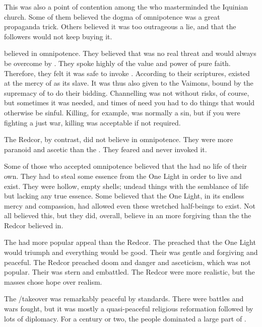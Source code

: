   This was also a point of contention among the \resphain who masterminded the Iquinian church.
  Some of them believed the dogma of omnipotence was a great propaganda trick.
  Others believed it was too outrageous a lie, and that the followers would not keep buying it. 
  
  \ClanTelcra believed in omnipotence. 
  They believed that \itzach was no real threat and would always be overcome by \iquin.
  They spoke highly of the value and power of pure faith. 
  Therefore, they felt it was safe to invoke \itzach. 
  According to their scriptures, \itzach existed at the mercy of \iquin as its slave. 
  It was thus also given to the Vaimons, bound by the supremacy of \iquin to do their bidding. 
  Channelling \itzach was not without risks, of course, but sometimes it was needed, and times of need you had to do things that would otherwise be sinful. 
  Killing, for example, was normally a sin, but if you were fighting a just war, killing was acceptable if not required. 
  
  The Redcor, by contrast, did not believe in omnipotence. 
  They were more paranoid and ascetic than the \Telcras. 
  They feared \itzach and never invoked it. 
  
  Some of those who accepted omnipotence believed that the \qliphoth had no life of their own.
  They had to steal some essence from the One Light in order to live and exist. 
  They were hollow, empty shells; undead things with the semblance of life but lacking any true essence. 
  Some believed that the One Light, in its endless mercy and compassion, had allowed even these wretched half-beings to exist.
  Not all \Telcras believed this, but they did, overall, believe in an \Iquin more forgiving than the \Iquin the Redcor believed in. 
  
  The \Telcras had more popular appeal than the Redcor.
  The \Telcras preached that the One Light would triumph and everything would be good.
  Their \iquin was gentle and forgiving and peaceful. 
  The Redcor preached doom and danger and asceticism, which was not popular. 
  Their \iquin was stern and embattled. 
  The Redcor were more realistic, but the masses chose hope over realism. 
  
  The \Telcra/\Tepharin takeover was remarkably peaceful by \Miithian standards. 
  There were battles and wars fought, but it was mostly a quasi-peaceful religious reformation followed by lots of diplomacy. 
  For a century or two, the \Tepharin people dominated a large part of \Azmith. 
  

